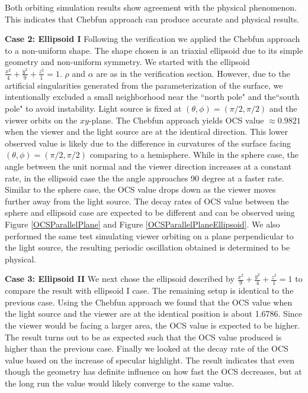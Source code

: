 \documentclass[11pt]{amsart}
\theoremstyle{definition}
\begin{document}
Both orbiting simulation results show agreement with the physical phenomenon. This indicates that Chebfun approach can produce accurate and physical results.

{\bf Case 2: Ellipsoid I} Following the verification we applied the Chebfun approach to a non-uniform shape. The shape chosen is an triaxial ellipsoid due to its simple geometry and non-uniform symmetry. We started with the ellipsoid $\frac{x^2}{4}+\frac{y^2}{9}+\frac{z^2}{1} = 1$. $\rho$ and $\alpha$ are as in the verification section. However, due to the artificial singularities generated from the parameterization of the surface, we intentionally excluded a small neighborhood near the ``north pole" and the``south pole" to avoid instability. Light source is fixed at $(\theta,\phi) = (\pi/2, \pi/2)$ and the viewer orbits on the $xy$-plane. The Chebfun approach yields OCS value $\approx 0.9821$ when the viewer and the light source are at the identical direction. This lower observed value is likely due to the difference in curvatures of the surface facing $(\theta, \phi)=(\pi/2, \pi/2)$ comparing to a hemisphere. While in the sphere case, the angle between the unit normal and the viewer direction increases at a constant rate, in the ellipsoid case the the angle approaches 90 degree at a faster rate. Similar to the sphere case, the OCS value drops down as the viewer moves further away from the light source. The decay rates of OCS value between the sphere and ellipsoid case are expected to be different and can be observed using Figure \ref{OCSParallelPlane} and Figure \ref{OCSParallelPlaneEllipsoid}. We also performed the same test simulating viewer orbiting on a plane perpendicular to the light source, the resulting periodic oscillation obtained is determined to be physical.

{\bf Case 3: Ellipsoid II} We next chose the ellipsoid described by $\frac{x^2}{9}+\frac{y^2}{4}+\frac{z^2}{1} = 1$ to compare the result with ellipsoid I case. The remaining setup is identical to the previous case. Using the Chebfun approach we found that the OCS value when the light source and the viewer are at the identical position is about 1.6786. Since the viewer would be facing a larger area, the OCS value is expected to be higher. The result turns out to be as expected such that the OCS value produced is higher than the previous case. Finally we looked at the decay rate of the OCS value based on the increase of specular highlight. The result indicates that even though the geometry has definite influence on how fast the OCS decreases, but at the long run the value would likely converge to the same value.
\end{document}
